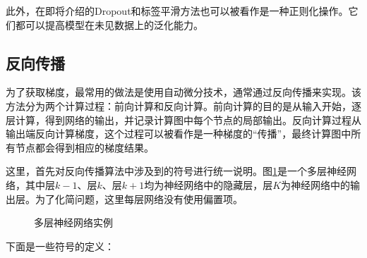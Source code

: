 \parinterval  此外，在{\chaptertwelve}即将介绍的Dropout和标签平滑方法也可以被看作是一种正则化操作。它们都可以提高模型在未见数据上的泛化能力。


\subsection{反向传播}\label{sec:9.4.6}

\parinterval  为了获取梯度，最常用的做法是使用自动微分技术，通常通过反向传播来实现。该方法分为两个计算过程：前向计算和反向计算。前向计算的目的是从输入开始，逐层计算，得到网络的输出，并记录计算图中每个节点的局部输出。反向计算过程从输出端反向计算梯度，这个过程可以被看作是一种梯度的“传播”，最终计算图中所有节点都会得到相应的梯度结果。

\parinterval  这里，首先对反向传播算法中涉及到的符号进行统一说明。图\ref{fig:9-52}是一个多层神经网络，其中层$ k-1 $、层$ k $、层$ k+1 $均为神经网络中的隐藏层，层$ K $为神经网络中的输出层。为了化简问题，这里每层网络没有使用偏置项。

\begin{figure}[htp]
\centering

\caption{多层神经网络实例}
\label{fig:9-52}
\end{figure}

\parinterval  下面是一些符号的定义：

